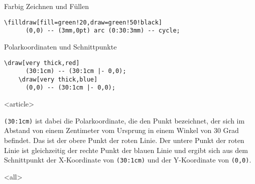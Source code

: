 \begin{Frame}[t,fragile]{Farbig Zeichnen und Füllen}

  \xxx

  \begin{lstlisting}[gobble=4]
    \filldraw[fill=green!20,draw=green!50!black]
      (0,0) -- (3mm,0pt) arc (0:30:3mm) -- cycle;
  \end{lstlisting}
\end{Frame}

\begin{Frame}[t,fragile]{Polarkoordinaten und Schnittpunkte}

  \xxx

  \begin{lstlisting}[gobble=4]
    \draw[very thick,red]
      (30:1cm) -- (30:1cm |- 0,0);
    \draw[very thick,blue]
      (0,0) -- (30:1cm |- 0,0);
  \end{lstlisting}
\end{Frame}

\mode
<article>

\lstinline-(30:1cm)- ist dabei die Polarkoordinate, die
den Punkt bezeichnet, der sich im Abstand von einem Zentimeter
vom Ursprung in einem Winkel von 30 Grad befindet. Das ist der
obere Punkt der roten Linie. Der untere Punkt der roten Linie
ist gleichzeitig der rechte Punkt der blauen Linie und
ergibt sich aus dem Schnittpunkt der X-Koordinate
von \lstinline-(30:1cm)- und der Y-Koordinate von
\lstinline-(0,0)-.

\mode
<all>

